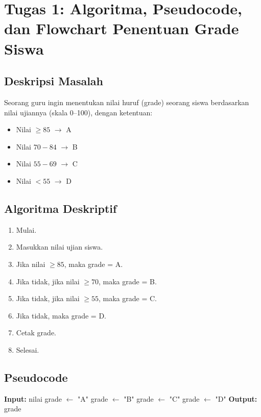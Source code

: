 \documentclass[a4paper,11pt]{article}
\begin{document}
\section*{Tugas 1: Algoritma, Pseudocode, dan Flowchart Penentuan Grade Siswa}

\subsection*{Deskripsi Masalah}
Seorang guru ingin menentukan nilai huruf (grade) seorang siswa berdasarkan nilai ujiannya (skala 0--100), dengan ketentuan:
\begin{itemize}
    \item Nilai $\geq 85$ $\rightarrow$ A
    \item Nilai $70-84$ $\rightarrow$ B
    \item Nilai $55-69$ $\rightarrow$ C
    \item Nilai $< 55$ $\rightarrow$ D
\end{itemize}

\subsection*{Algoritma Deskriptif}
\begin{enumerate}
    \item Mulai.
    \item Masukkan nilai ujian siswa.
    \item Jika nilai $\geq 85$, maka grade = A.
    \item Jika tidak, jika nilai $\geq 70$, maka grade = B.
    \item Jika tidak, jika nilai $\geq 55$, maka grade = C.
    \item Jika tidak, maka grade = D.
    \item Cetak grade.
    \item Selesai.
\end{enumerate}

\subsection*{Pseudocode}
\begin{algorithm}[h]
\caption{Penentuan Grade Siswa}
\begin{algorithmic}[1]
\State \textbf{Input:} nilai
    \State grade $\gets$ "A"
    \State grade $\gets$ "B"
    \State grade $\gets$ "C"
\Else
    \State grade $\gets$ "D"
\EndIf
\State \textbf{Output:} grade
\end{algorithmic}
\end{algorithm}
\end{document}
